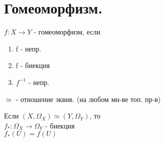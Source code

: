 \documentclass[geometry.tex]{subfiles}
\begin{document}
  \section{Гомеоморфизм.}

  \begin{definition}
      $f: X \rightarrow Y$ - гомеоморфизм, если\\
      \begin{enumerate}
          \item f - непр.
          \item f - биекция
          \item $f^{-1}$ - непр.
      \end{enumerate}
  \end{definition}

  \begin{hypothesis}
      $\simeq$ - отношение эквив. (на любом мн-ве топ. пр-в)
  \end{hypothesis}

  \begin{theorem}
      Если $(X, \Omega_X) \simeq (Y, \Omega_Y)$, то\\
      $f_*: \Omega_X \rightarrow \Omega_Y$ - биекция\\
      $f_*(U) = f(U)$
  \end{theorem}
\end{document}
